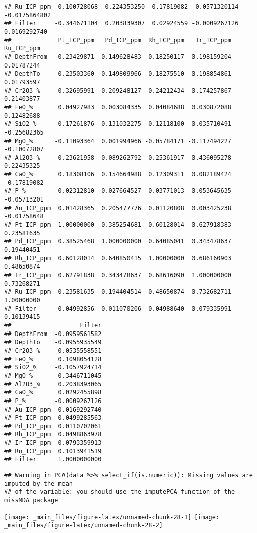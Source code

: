 \documentclass[
]{article}
\begin{document}
\begin{verbatim}
## Ru_ICP_ppm -0.100728068  0.224353250 -0.17819082 -0.0571320114 -0.0175864802
## Filter     -0.344671104  0.203839307  0.02924559 -0.0009267126  0.0169292740
##             Pt_ICP_ppm   Pd_ICP_ppm  Rh_ICP_ppm   Ir_ICP_ppm  Ru_ICP_ppm
## DepthFrom  -0.23429871 -0.149628483 -0.18250117 -0.198159204  0.01787244
## DepthTo    -0.23503360 -0.149809966 -0.18275510 -0.198854861  0.01793597
## Cr2O3_%    -0.32695991 -0.209248127 -0.24212434 -0.174257867  0.21403877
## FeO_%       0.04927983  0.003084335  0.04084688  0.030872088  0.12482688
## SiO2_%      0.17261876  0.131032275  0.12118100  0.035710491 -0.25682365
## MgO_%      -0.11093364  0.001994966 -0.05784171 -0.117494227 -0.10072807
## Al2O3_%     0.23621958  0.089262792  0.25361917  0.436095278  0.22435325
## CaO_%       0.18308106  0.154664988  0.12309311  0.082189424 -0.17819082
## P_%        -0.02312810 -0.027664527 -0.03771013 -0.053645635 -0.05713201
## Au_ICP_ppm  0.01428365  0.205477776  0.01120808  0.003425238 -0.01758648
## Pt_ICP_ppm  1.00000000  0.385254681  0.60128014  0.627918383  0.23581635
## Pd_ICP_ppm  0.38525468  1.000000000  0.64085041  0.343478637  0.19440451
## Rh_ICP_ppm  0.60128014  0.640850415  1.00000000  0.686160903  0.48650874
## Ir_ICP_ppm  0.62791838  0.343478637  0.68616090  1.000000000  0.73268271
## Ru_ICP_ppm  0.23581635  0.194404514  0.48650874  0.732682711  1.00000000
## Filter      0.04992856  0.011070206  0.04988640  0.079335991  0.10139415
##                   Filter
## DepthFrom  -0.0959561582
## DepthTo    -0.0955935549
## Cr2O3_%     0.0535558551
## FeO_%       0.1098054128
## SiO2_%     -0.1057924714
## MgO_%      -0.3446711045
## Al2O3_%     0.2038393065
## CaO_%       0.0292455898
## P_%        -0.0009267126
## Au_ICP_ppm  0.0169292740
## Pt_ICP_ppm  0.0499285563
## Pd_ICP_ppm  0.0110702061
## Rh_ICP_ppm  0.0498863978
## Ir_ICP_ppm  0.0793359913
## Ru_ICP_ppm  0.1013941519
## Filter      1.0000000000
\end{verbatim}

\begin{verbatim}
## Warning in PCA(data %>% select_if(is.numeric)): Missing values are imputed by the mean
## of the variable: you should use the imputePCA function of the missMDA package
\end{verbatim}

\begin{center}\texttt{[image: \_main\_files/figure-latex/unnamed-chunk-28-1]} \texttt{[image: \_main\_files/figure-latex/unnamed-chunk-28-2]} \end{center}
\end{document}
